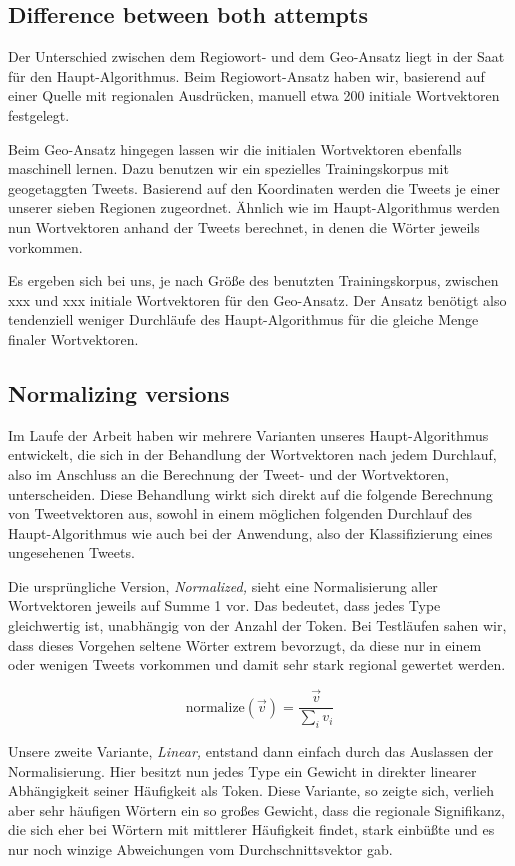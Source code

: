 \documentclass[../Main.tex]{subfiles}
\begin{document}
\subsection{Difference between both attempts}
Der Unterschied zwischen dem Regiowort- und dem Geo-Ansatz liegt in der Saat für den Haupt-Algorithmus. Beim Regiowort-Ansatz haben wir, basierend auf einer Quelle mit regionalen Ausdrücken, manuell etwa 200 initiale Wortvektoren festgelegt.

Beim Geo-Ansatz hingegen lassen wir die initialen Wortvektoren ebenfalls maschinell lernen. Dazu benutzen wir ein spezielles Trainingskorpus mit geogetaggten Tweets. Basierend auf den Koordinaten werden die Tweets je einer unserer sieben Regionen zugeordnet. Ähnlich wie im Haupt-Algorithmus werden nun Wortvektoren anhand der Tweets berechnet, in denen die Wörter jeweils vorkommen.

Es ergeben sich bei uns, je nach Größe des benutzten Trainingskorpus, zwischen xxx und xxx initiale Wortvektoren für den Geo-Ansatz. Der Ansatz benötigt also tendenziell weniger Durchläufe des Haupt-Algorithmus für die gleiche Menge finaler Wortvektoren.

\subsection{Normalizing versions}
Im Laufe der Arbeit haben wir mehrere Varianten unseres Haupt-Algorithmus entwickelt, die sich in der Behandlung der Wortvektoren nach jedem Durchlauf, also im Anschluss an die Berechnung der Tweet- und der Wortvektoren, unterscheiden. Diese Behandlung wirkt sich direkt auf die folgende Berechnung von Tweetvektoren aus, sowohl in einem möglichen folgenden Durchlauf des Haupt-Algorithmus wie auch bei der Anwendung, also der Klassifizierung eines ungesehenen Tweets.

Die ursprüngliche Version, \textit{Normalized,} sieht eine Normalisierung aller Wortvektoren jeweils auf Summe 1 vor. Das bedeutet, dass jedes Type gleichwertig ist, unabhängig von der Anzahl der Token. Bei Testläufen sahen wir, dass dieses Vorgehen seltene Wörter extrem bevorzugt, da diese nur in einem oder wenigen Tweets vorkommen und damit sehr stark regional gewertet werden.

$$\text{normalize}(\vec v) = \frac{\vec v}{\sum_i v_i}$$

Unsere zweite Variante, \textit{Linear,} entstand dann einfach durch das Auslassen der Normalisierung. Hier besitzt nun jedes Type ein Gewicht in direkter linearer Abhängigkeit seiner Häufigkeit als Token. Diese Variante, so zeigte sich, verlieh aber sehr häufigen Wörtern ein so großes Gewicht, dass die regionale Signifikanz, die sich eher bei Wörtern mit mittlerer Häufigkeit findet, stark einbüßte und es nur noch winzige Abweichungen vom Durchschnittsvektor gab.
\end{document}

